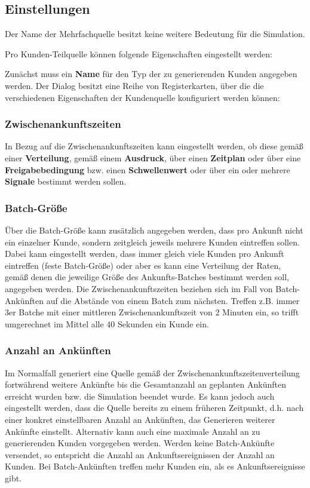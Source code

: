 \subsection*{Einstellungen}

Der Name der Mehrfachquelle besitzt keine weitere Bedeutung für die Simulation.

Pro Kunden-Teilquelle können folgende Eigenschaften eingestellt werden: 

Zunächst muss ein \textbf{Name} für den Typ der zu generierenden Kunden angegeben werden.
Der Dialog besitzt eine Reihe von Registerkarten, über die die verschiedenen Eigenschaften
der Kundenquelle konfiguriert werden können:

\subsubsection*{Zwischenankunftszeiten}

In Bezug auf die Zwischenankunftszeiten kann eingestellt werden, ob diese gemäß einer
\textbf{Verteilung}, gemäß einem \textbf{Ausdruck}, über einen \textbf{Zeitplan} oder über eine
\textbf{Freigabebedingung} bzw. einen \textbf{Schwellenwert} oder über
ein oder mehrere \textbf{Signale} bestimmt werden sollen.

\subsubsection*{Batch-Größe}

Über die Batch-Größe kann zusätzlich
angegeben werden, dass pro Ankunft nicht ein einzelner Kunde, sondern zeitgleich jeweils
mehrere Kunden eintreffen sollen. Dabei kann eingestellt werden, dass immer gleich
viele Kunden pro Ankunft eintreffen (feste Batch-Größe) oder aber es kann eine Verteilung
der Raten, gemäß denen die jeweilige Größe des Ankunfts-Batches bestimmt werden soll,
angegeben werden.
Die Zwischenankunftszeiten beziehen sich im Fall von Batch-Ankünften auf die Abstände von
einem Batch zum nächsten. Treffen z.B. immer 3er Batche mit einer mittleren Zwischenankunftszeit
von 2 Minuten ein, so trifft umgerechnet im Mittel alle 40 Sekunden ein Kunde ein.

\subsubsection*{Anzahl an Ankünften}

Im Normalfall generiert eine Quelle gemäß der Zwischenankunftszeitenverteilung fortwährend
weitere Ankünfte bis die Gesamtanzahl an geplanten Ankünften erreicht wurden bzw. die Simulation beendet wurde.
Es kann jedoch auch eingestellt werden, dass die Quelle bereits zu einem früheren Zeitpunkt,
d.h. nach einer konkret einstellbaren Anzahl an Ankünften, das Generieren weiterer Ankünfte einstellt.
Alternativ kann auch eine maximale Anzahl an zu generierenden Kunden vorgegeben werden.
Werden keine Batch-Ankünfte versendet, so entspricht die Anzahl an Ankunftsereignissen der
Anzahl an Kunden. Bei Batch-Ankünften treffen mehr Kunden ein, als es Ankunftsereignisse gibt.


